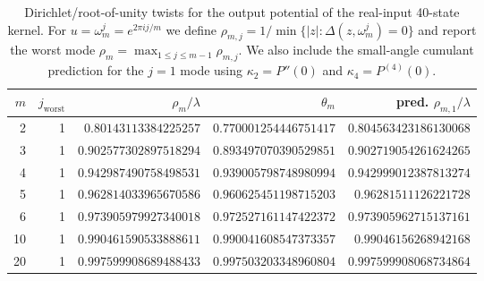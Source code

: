 \begin{table}[H]
\centering
\scriptsize
\setlength{\tabcolsep}{6pt}
\caption{Dirichlet/root-of-unity twists for the output potential of the real-input 40-state kernel. For $u=\omega_m^j=e^{2\pi i j/m}$ we define $\rho_{m,j}=1/\min\{|z|: \Delta(z,\omega_m^j)=0\}$ and report the worst mode $\rho_m=\max_{1\le j\le m-1}\rho_{m,j}$. We also include the small-angle cumulant prediction for the $j=1$ mode using $\kappa_2=P''(0)$ and $\kappa_4=P^{(4)}(0)$.}
\label{tab:real_input_40_output_potential_dirichlet_twists}
\begin{tabular}{r r r r r}
\toprule
$m$ & $j_{\mathrm{worst}}$ & $\rho_m/\lambda$ & $\theta_m$ & pred. $\rho_{m,1}/\lambda$\\
\midrule
2 & 1 & $0.80143113384225257$ & $0.770001254446751417$ & $0.804563423186130068$\\
3 & 1 & $0.902577302897518294$ & $0.893497070390529851$ & $0.902719054261624265$\\
4 & 1 & $0.942987490758498531$ & $0.939005798748980994$ & $0.942999012387813274$\\
5 & 1 & $0.962814033965670586$ & $0.960625451198715203$ & $0.96281511126221728$\\
6 & 1 & $0.973905979927340018$ & $0.972527161147422372$ & $0.973905962715137161$\\
10 & 1 & $0.990461590533888611$ & $0.990041608547373357$ & $0.99046156268942168$\\
20 & 1 & $0.997599908689488433$ & $0.997503203348960804$ & $0.997599908068734864$\\
\bottomrule
\end{tabular}
\end{table}

